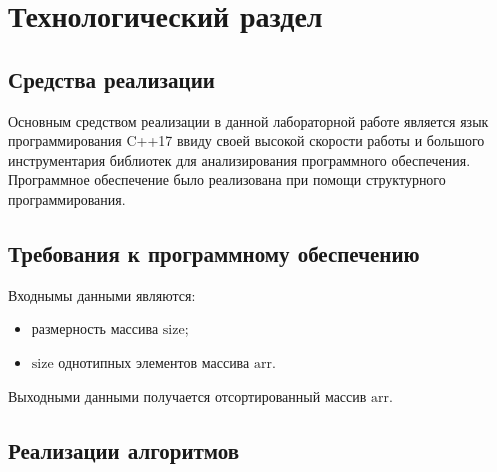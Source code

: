 \chapter{Технологический раздел}
\label{cha:impl}


\section{Средства реализации}
Основным средством реализации в данной лабораторной работе является язык программирования C++17 \cite{iso_2017} ввиду своей высокой скорости работы и большого инструментария библиотек для анализирования программного обеспечения. Программное обеспечение было реализована при помощи структурного программирования.

\section{Требования к программному обеспечению}
Входнымы данными являются:
\begin{itemize}
    \item размерность массива $\text{size}$;
    \item $\text{size}$ однотипных элементов массива $\text{arr}$.
\end{itemize}
Выходными данными получается отсортированный массив $\text{arr}$.



\section{Реализации алгоритмов}




